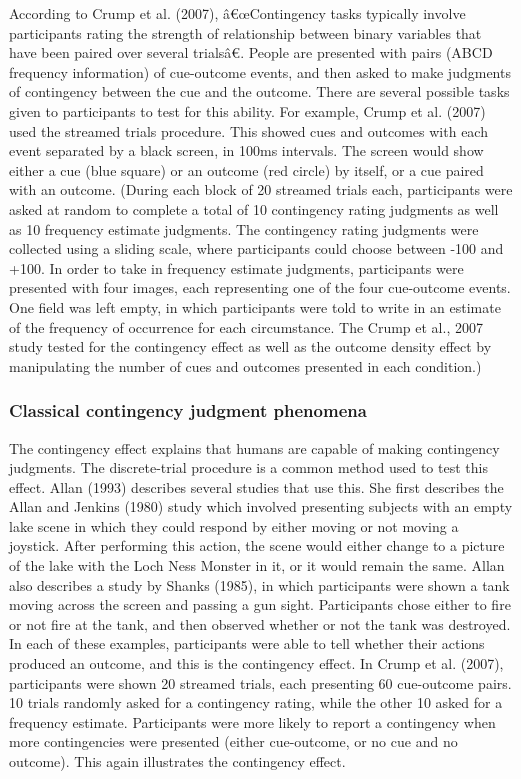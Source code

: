 \documentclass[
  english,
  man,floatsintext]{apa6}
\begin{document}
According to Crump et al. (2007), â€œContingency tasks typically involve participants rating the strength of relationship between binary variables that have been paired over several trialsâ€. People are presented with pairs (ABCD frequency information) of cue-outcome events, and then asked to make judgments of contingency between the cue and the outcome. There are several possible tasks given to participants to test for this ability. For example, Crump et al. (2007) used the streamed trials procedure. This showed cues and outcomes with each event separated by a black screen, in 100ms intervals. The screen would show either a cue (blue square) or an outcome (red circle) by itself, or a cue paired with an outcome. (During each block of 20 streamed trials each, participants were asked at random to complete a total of 10 contingency rating judgments as well as 10 frequency estimate judgments. The contingency rating judgments were collected using a sliding scale, where participants could choose between -100 and +100. In order to take in frequency estimate judgments, participants were presented with four images, each representing one of the four cue-outcome events. One field was left empty, in which participants were told to write in an estimate of the frequency of occurrence for each circumstance. The Crump et al., 2007 study tested for the contingency effect as well as the outcome density effect by manipulating the number of cues and outcomes presented in each condition.)

\hypertarget{classical-contingency-judgment-phenomena}{%
\subsubsection{Classical contingency judgment phenomena}\label{classical-contingency-judgment-phenomena}}

The contingency effect explains that humans are capable of making contingency judgments. The discrete-trial procedure is a common method used to test this effect. Allan (1993) describes several studies that use this. She first describes the Allan and Jenkins (1980) study which involved presenting subjects with an empty lake scene in which they could respond by either moving or not moving a joystick. After performing this action, the scene would either change to a picture of the lake with the Loch Ness Monster in it, or it would remain the same. Allan also describes a study by Shanks (1985), in which participants were shown a tank moving across the screen and passing a gun sight. Participants chose either to fire or not fire at the tank, and then observed whether or not the tank was destroyed. In each of these examples, participants were able to tell whether their actions produced an outcome, and this is the contingency effect. In Crump et al. (2007), participants were shown 20 streamed trials, each presenting 60 cue-outcome pairs. 10 trials randomly asked for a contingency rating, while the other 10 asked for a frequency estimate. Participants were more likely to report a contingency when more contingencies were presented (either cue-outcome, or no cue and no outcome). This again illustrates the contingency effect.
\end{document}
